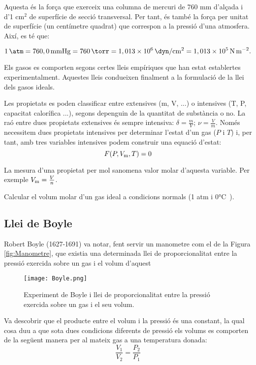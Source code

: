Aquesta és la força que exerceix una columna de mercuri de 760 mm d'alçada i d'1 $\text{cm}^2$ de superfície de secció transversal. Per tant, és també la força per unitat de superfície (un centímetre quadrat) que correspon a la pressió d'una atmosfera. Així, es té que:

\[
1 \, \si{\atm} = 760,0 \, \si\mmHg= 760 \,\si\torr
= 1,013 \times 10^6 \, \si{\dyn\per\square\cm} = 1,013 \times 10^5 \, \si{\newton\per\square\meter}.
\]

Els gasos es comporten segons certes lleis empíriques que han estat establertes experimentalment. Aquestes lleis condueixen finalment a la formulació de la llei dels gasos ideals.

\begin{mybox}[title=Quantitats intensives i extensives]
    Les propietats es poden classificar entre extensives (m, V, ...) o intensives (T, P, capacitat calorífica ...), segons depenguin de la quantitat de substància o no. La raó entre dues propietats extensives és sempre intensiva: $\delta = \frac{m}{V}$; $\nu = \frac{V}{m}$. Només necessitem dues propietats intensives per determinar l'estat d'un gas ($P$ i $T$) i, per tant, amb tres variables intensives podem construir una equació d'estat: 
    \[F(P,V_{\rm m},T)=0\]
    
    La mesura d'una propietat per mol sanomena valor molar d'aquesta variable. Per exemple $V_{\rm m} = \frac{V}{n}$. 
\end{mybox}

\begin{exr}
    Calcular el volum molar d'un gas ideal a condicions normals (1 atm i 0\si\degreeCelsius).
    \end{exr}
\subsection{Llei de Boyle}

Robert Boyle (1627-1691) va notar, fent servir un manometre com el de la Figura \ref{fig:Manometre}, que existia una determinada llei de proporcionalitat entre la pressió exercida sobre un gas i el volum d'aquest
\begin{figure}[h]
\centering
\texttt{[image: Boyle.png]}
\caption{Experiment de Boyle i llei de proporcionalitat entre la pressió exercida sobre un gas i el seu volum.}
\label{fig:Boyle}
\end{figure}
Va descobrir que el producte entre el volum i la pressió és una constant, la qual cosa duu a que sota dues condicions diferents de pressió els volums es comporten de la següent manera per al mateix gas a una temperatura donada:
\[
\frac{V_1}{V_2}=\frac{P_2}{P_1}
\]

